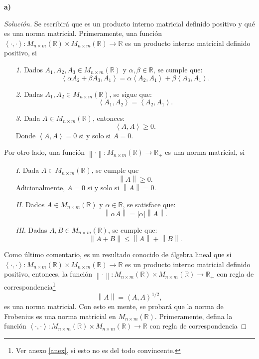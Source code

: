 \documentclass[10.5pt,notitlepage]{article}
\newenvironment{solucion}
  {\begin{proof}[Solución]}
  {\end{proof}}
\newcommand{\RR}{\mathbb{R}}
\newcommand{\abs}[1]{\left\lvert #1 \right\rvert}
\newcommand{\norm}[1]{\left\| #1 \right\|}
\newcommand{\inner}[1]{\left\langle #1 \right\rangle}
\theoremstyle{plain}
\begin{document}
\begin{exo}

\end{exo}
\textbf{a)}
\begin{solucion}
Se escribirá que es un producto interno matricial definido positivo y qué es una norma matricial. Primeramente, una función \(\inner{\cdot, \cdot} : M_{n \times m}(\RR)\times M_{n \times m}(\RR) \to \RR\) es un producto interno matricial definido positivo, si
\begin{itemize}\label{item.1}
    \item[\textit{1.}] Dados \(A_1,A_2,A_3\in M_{n\times m}(\RR)\) y \(\alpha, \beta \in \RR\), se cumple que: \[\inner{\alpha A_2+ \beta A_3, A_1} = \alpha \inner{A_2,A_1} + \beta \inner{A_3, A_1}.\]
    \item[\textit{2.}] Dadas \(A_1,A_2 \in M_{n\times m}(\RR)\), se sigue que: \[\inner{A_1,A_2}= \inner{A_2,A_1}.\]
    \item[\textit{3.}] Dada \(A \in M_{n\times m}(\RR)\), entonces: \[\inner{A,A} \geq 0.\] Donde \(\inner{A,A} = 0\) si y solo si \(A=0\).
\end{itemize}
Por otro lado, una función \(\norm{ \cdot} : M_{n \times m}(\RR)\to \RR_{+}\) es una norma matricial, si
\begin{itemize}\label{item.2}
    \item[\textit{I}.] Dada \(A \in M_{n\times m}(\RR)\), se cumple que \[\norm{A} \geq 0.\] Adicionalmente, \(A = 0\) si y solo si \(\norm{A} = 0.\) 
    \item[\textit{II}.] Dados \(A \in M_{n\times m}(\RR)\) y \(\alpha \in \RR\), se satisface que: \[\norm{\alpha A} = \abs{\alpha}\norm{A}.\]
    \item[\textit{III}.] Dadas \(A,B \in M_{n\times m}(\RR)\), se cumple que: \[\norm{A + B} \leq \norm{A} + \norm{B}.\] 
\end{itemize}
Como último comentario, es un resultado conocido de álgebra lineal que si \(\inner{\cdot , \cdot} : M_{n \times m}(\RR)\times M_{n \times m}(\RR) \to \RR\) es un producto interno matricial definido positivo, entonces, la función \(\norm{\cdot} : M_{n \times m}(\RR)\times M_{n \times m}(\RR) \to \RR_{+}\) con regla de correspondencia\footnote{Ver anexo \ref{anex}, si esto no es del todo convincente.}
\[
\norm{A} = \inner{A, A}^{1/2},
\]
es una norma matricial. Con esto en mente, se probará que la norma de Frobenius es una norma matricial en \(M_{n\times m}(\RR)\). Primeramente, defina la función \(\inner{\cdot,\cdot}:M_{n\times m}(\RR)\times M_{n\times m}(\RR)  \to \RR\) con regla de correspondencia 

\end{solucion}
\end{document}
